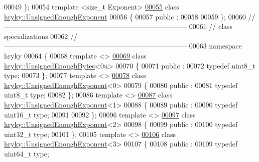 \begin{DoxyCode}
00049 \};
00054 \textcolor{keyword}{template} <\textcolor{keywordtype}{size\_t} Exponent>
\hypertarget{unsigned__enough_8h_source_l00055}{}\hyperlink{classhryky_1_1_unsigned_enough_exponent}{00055} \textcolor{keyword}{class }\hyperlink{classhryky_1_1_unsigned_enough_exponent}{hryky::UnsignedEnoughExponent}
00056 \{
00057 \textcolor{keyword}{public} :
00058 
00059 \};
00060 \textcolor{comment}{//
      ------------------------------------------------------------------------------}
00061 \textcolor{comment}{// class specializations}
00062 \textcolor{comment}{//
      ------------------------------------------------------------------------------}
00063 \textcolor{keyword}{namespace }hryky
00064 \{
00068 \textcolor{keyword}{template} <>
\hypertarget{unsigned__enough_8h_source_l00069}{}\hyperlink{classhryky_1_1hryky_1_1_unsigned_enough_bytes_3_010u_01_4}{00069} \textcolor{keyword}{class }\hyperlink{classhryky_1_1_unsigned_enough_bytes}{hryky::UnsignedEnoughBytes}<0u>
00070 \{
00071 \textcolor{keyword}{public} :
00072     \textcolor{keyword}{typedef} uint8\_t type;
00073 \};
00077 \textcolor{keyword}{template} <>
\hypertarget{unsigned__enough_8h_source_l00078}{}\hyperlink{classhryky_1_1hryky_1_1_unsigned_enough_exponent_3_010_01_4}{00078} \textcolor{keyword}{class }\hyperlink{classhryky_1_1_unsigned_enough_exponent}{hryky::UnsignedEnoughExponent}<0>
00079 \{
00080 \textcolor{keyword}{public} :
00081     \textcolor{keyword}{typedef} uint8\_t type;
00082 \};
00086 \textcolor{keyword}{template} <>
\hypertarget{unsigned__enough_8h_source_l00087}{}\hyperlink{classhryky_1_1hryky_1_1_unsigned_enough_exponent_3_011_01_4}{00087} \textcolor{keyword}{class }\hyperlink{classhryky_1_1_unsigned_enough_exponent}{hryky::UnsignedEnoughExponent}<1>
00088 \{
00089 \textcolor{keyword}{public} :
00090     \textcolor{keyword}{typedef} uint16\_t type;
00091 
00092 \};
00096 \textcolor{keyword}{template} <>
\hypertarget{unsigned__enough_8h_source_l00097}{}\hyperlink{classhryky_1_1hryky_1_1_unsigned_enough_exponent_3_012_01_4}{00097} \textcolor{keyword}{class }\hyperlink{classhryky_1_1_unsigned_enough_exponent}{hryky::UnsignedEnoughExponent}<2>
00098 \{
00099 \textcolor{keyword}{public} :
00100     \textcolor{keyword}{typedef} uint32\_t type;
00101 \};
00105 \textcolor{keyword}{template} <>
\hypertarget{unsigned__enough_8h_source_l00106}{}\hyperlink{classhryky_1_1hryky_1_1_unsigned_enough_exponent_3_013_01_4}{00106} \textcolor{keyword}{class }\hyperlink{classhryky_1_1_unsigned_enough_exponent}{hryky::UnsignedEnoughExponent}<3>
00107 \{
00108 \textcolor{keyword}{public} :
00109     \textcolor{keyword}{typedef} uint64\_t type;

\end{DoxyCode}
